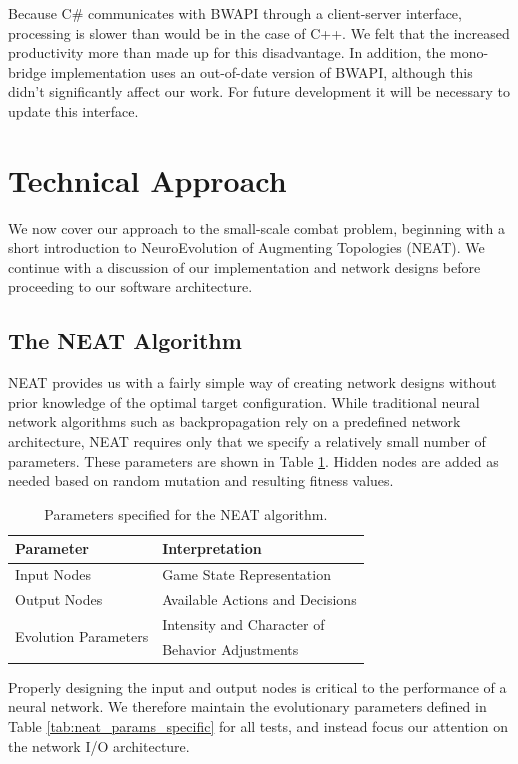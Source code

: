 \documentclass[a4paper]{article}
\begin{document}
Because C\# communicates with BWAPI through a client-server interface, processing is slower than would be in the case of C++. We felt that the increased productivity more than made up for this disadvantage. In addition, the mono-bridge implementation uses an out-of-date version of BWAPI, although this didn't significantly affect our work. For future development it will be necessary to update this interface.

\section{Technical Approach}
\label{sec:tech}

We now cover our approach to the small-scale combat problem, beginning with a short introduction to NeuroEvolution of Augmenting Topologies (NEAT). We continue with a discussion of our implementation and network designs before proceeding to our software architecture.

\subsection{The NEAT Algorithm}
\label{sec:neat}

NEAT provides us with a fairly simple way of creating network designs without prior knowledge of the optimal target configuration. While traditional neural network algorithms such as backpropagation rely on a predefined network architecture, NEAT requires only that we specify a relatively small number of parameters. These parameters are shown in Table \ref{tab:neat_params}. Hidden nodes are added as needed based on random mutation and resulting fitness values.

\begin{table}
\centering
\begin{tabular}{|l|l|}
	\hline
	{\bf Parameter} & {\bf Interpretation}\\ \hline
	Input Nodes & Game State Representation\\ \hline
	Output Nodes & Available Actions and Decisions\\ \hline
	\multirow{2}{*}{Evolution Parameters} &  Intensity and Character of\\
	& Behavior Adjustments\\ \hline
\end{tabular}
\caption{Parameters specified for the NEAT algorithm.}
\label{tab:neat_params}
\end{table}

Properly designing the input and output nodes is critical to the performance of a neural network. We therefore maintain the evolutionary parameters defined in Table \ref{tab:neat_params_specific} for all tests, and instead focus our attention on the network I/O architecture.
\end{document}
